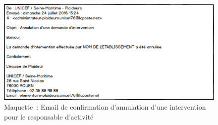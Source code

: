 \begin{figure}[H]
	\centering
	\includegraphics[scale=0.7]{images/maquettes/fonctionnalite4MailConfirmationSuppressionDemandePourAdmin.png}
	\caption{Maquette~: Email de confirmation d'annulation d'une intervention pour le responsable d'activité}	\label{maquetteCourrielConfirmationAnnulationResponsable}
\end{figure}